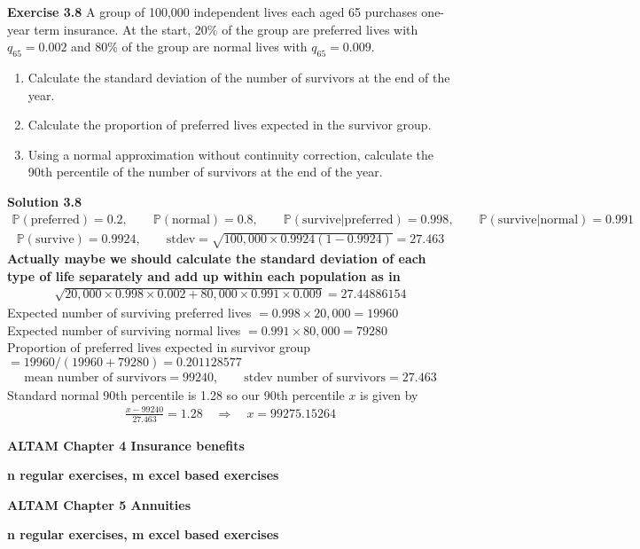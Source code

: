 \documentclass[hidelinks, 12pt]{article}
\theoremstyle{mydefstyle}
\theoremstyle{mythmstyle}
\newcounter{prop}
\begin{document}
\textbf{Exercise 3.8} A group of 100,000 independent lives each aged 65 purchases one-year term insurance. At the start, 20\% of the group are preferred lives with $q_{65} = 0.002$ and 80\% of the group are normal lives with $q_{65} = 0.009$. 
\begin{enumerate}[label = (\alph*)]
\item Calculate the standard deviation of the number of survivors at the end of the year.
\item Calculate the proportion of preferred lives expected in the survivor group.
\item Using a normal approximation without continuity correction, calculate the 90th percentile of the number of survivors at the end of the year.
\end{enumerate}

\textbf{Solution 3.8}
\begin{gather*}
\mathbb{P}(\mbox{preferred}) = 0.2, \qquad \mathbb{P}(\mbox{normal}) = 0.8, \qquad
\mathbb{P}(\mbox{survive}|\mbox{preferred}) = 0.998, \qquad
\mathbb{P}(\mbox{survive}|\mbox{normal}) = 0.991
\end{gather*}
\begin{gather*}
\mathbb{P}(\mbox{survive}) = 0.9924, \qquad \mbox{stdev} = \sqrt{100,000 \times 0.9924(1 - 0.9924)} = 27.463
\end{gather*}
\color{red}
\textbf{Actually maybe we should calculate the standard deviation of each type of life separately and add up within each population as in}
\begin{gather*}
\sqrt{20,000 \times 0.998 \times 0.002 + 80,000 \times 0.991 \times 0.009} = 27.44886154
\end{gather*}
\color{black}
Expected number of surviving preferred lives $= 0.998 \times 20,000 = 19960$ \\
Expected number of surviving normal lives $= 0.991 \times 80,000 = 79280$ \\
Proportion of preferred lives expected in survivor group $= 19960 / (19960 + 79280) = 0.201128577$
\begin{gather*}
\mbox{mean number of survivors} = 99240, \qquad \mbox{stdev number of survivors} = 27.463
\end{gather*}
Standard normal 90th percentile is 1.28 so our 90th percentile $x$ is given by
\begin{gather*}
\frac{x - 99240}{27.463} = 1.28 \quad\Rightarrow\quad x = 99275.15264
\end{gather*}

\textbf{ALTAM Chapter 4 Insurance benefits}

\textbf{n regular exercises, m excel based exercises}

\textbf{ALTAM Chapter 5 Annuities}

\textbf{n regular exercises, m excel based exercises}
\end{document}
